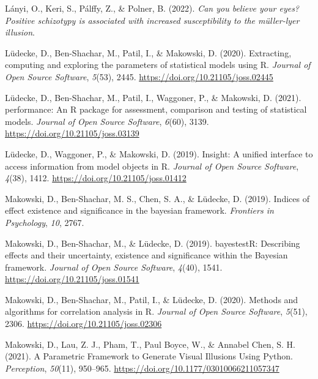 \documentclass[
  man,floatsintext]{apa6}
\newlength{\cslhangindent}
\newlength{\cslentryspacingunit} %
\newenvironment{CSLReferences}[2] %
 {%
  \setlength{\parindent}{0pt}
  \ifodd #1
  \let\oldpar\par
  \def\par{\hangindent=\cslhangindent\oldpar}
  \fi
  \setlength{\parskip}{#2\cslentryspacingunit}
 }%
 {}
\begin{document}
\begin{CSLReferences}{1}{0}
\leavevmode{}%
Lányi, O., Keri, S., Pálffy, Z., \& Polner, B. (2022). \emph{Can you believe your eyes? Positive schizotypy is associated with increased susceptibility to the m{ü}ller-lyer illusion}.

\leavevmode{}%
Lüdecke, D., Ben-Shachar, M., Patil, I., \& Makowski, D. (2020). Extracting, computing and exploring the parameters of statistical models using {R}. \emph{Journal of Open Source Software}, \emph{5}(53), 2445. \url{https://doi.org/10.21105/joss.02445}

\leavevmode{}%
Lüdecke, D., Ben-Shachar, M., Patil, I., Waggoner, P., \& Makowski, D. (2021). {performance}: An {R} package for assessment, comparison and testing of statistical models. \emph{Journal of Open Source Software}, \emph{6}(60), 3139. \url{https://doi.org/10.21105/joss.03139}

\leavevmode{}%
Lüdecke, D., Waggoner, P., \& Makowski, D. (2019). Insight: A unified interface to access information from model objects in {R}. \emph{Journal of Open Source Software}, \emph{4}(38), 1412. \url{https://doi.org/10.21105/joss.01412}

\leavevmode{}%
Makowski, D., Ben-Shachar, M. S., Chen, S. A., \& Lüdecke, D. (2019). Indices of effect existence and significance in the bayesian framework. \emph{Frontiers in Psychology}, \emph{10}, 2767.

\leavevmode{}%
Makowski, D., Ben-Shachar, M., \& Lüdecke, D. (2019). {bayestestR}: Describing effects and their uncertainty, existence and significance within the {Bayesian} framework. \emph{Journal of Open Source Software}, \emph{4}(40), 1541. \url{https://doi.org/10.21105/joss.01541}

\leavevmode{}%
Makowski, D., Ben-Shachar, M., Patil, I., \& Lüdecke, D. (2020). Methods and algorithms for correlation analysis in {R}. \emph{Journal of Open Source Software}, \emph{5}(51), 2306. \url{https://doi.org/10.21105/joss.02306}

\leavevmode{}%
Makowski, D., Lau, Z. J., Pham, T., Paul Boyce, W., \& Annabel Chen, S. H. (2021). A Parametric Framework to Generate Visual Illusions Using Python. \emph{Perception}, \emph{50}(11), 950--965. \url{https://doi.org/10.1177/03010066211057347}


\end{CSLReferences}
\end{document}
